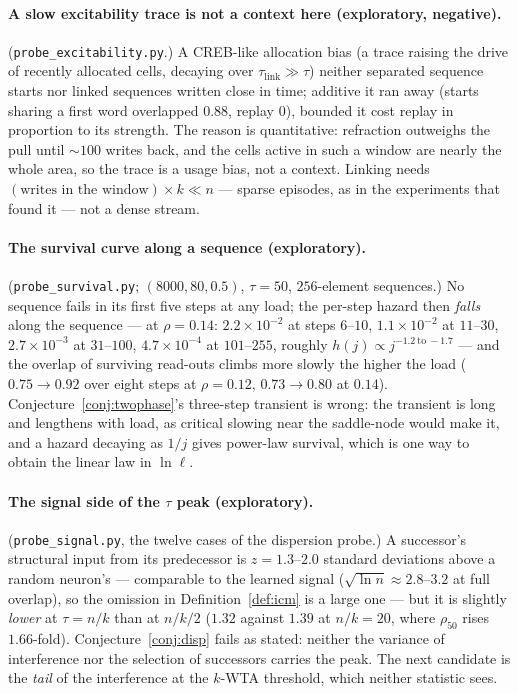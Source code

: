 \documentclass[11pt]{article}
\theoremstyle{definition}
\theoremstyle{plain}
\begin{document}
\paragraph{A slow excitability trace is not a context here (exploratory,
negative).} (\texttt{probe\_excitability.py}.) A CREB-like allocation bias (a
trace raising the drive of recently allocated cells, decaying over
$\tau_{\mathrm{link}} \gg \tau$) neither separated sequence starts nor linked
sequences written close in time; additive it ran away (starts sharing a first
word overlapped $0.88$, replay $0$), bounded it cost replay in proportion to its
strength. The reason is quantitative: refraction outweighs the pull until
$\sim 100$ writes back, and the cells active in such a window are nearly the
whole area, so the trace is a usage bias, not a context. Linking needs
$(\text{writes in the window}) \times k \ll n$ --- sparse episodes, as in the
experiments that found it --- not a dense stream.

\paragraph{The survival curve along a sequence (exploratory).}
(\texttt{probe\_survival.py}; $(8000,80,0.5)$, $\tau = 50$, $256$-element
sequences.) No sequence fails in its first five steps at any load; the
per-step hazard then \emph{falls} along the sequence --- at $\rho = 0.14$:
$2.2\times10^{-2}$ at steps $6$--$10$, $1.1\times10^{-2}$ at $11$--$30$,
$2.7\times10^{-3}$ at $31$--$100$, $4.7\times10^{-4}$ at $101$--$255$, roughly
$h(j) \propto j^{-1.2\ \text{to}\ -1.7}$ --- and the overlap of surviving read-outs
climbs more slowly the higher the load ($0.75 \to 0.92$ over eight steps at
$\rho = 0.12$, $0.73 \to 0.80$ at $0.14$). Conjecture~\ref{conj:twophase}'s
three-step transient is wrong: the transient is long and lengthens with load,
as critical slowing near the saddle-node would make it, and a hazard decaying
as $1/j$ gives power-law survival, which is one way to obtain the linear law in
$\ln\ell$.

\paragraph{The signal side of the $\tau$ peak (exploratory).}
(\texttt{probe\_signal.py}, the twelve cases of the dispersion probe.) A
successor's structural input from its predecessor is $z = 1.3$--$2.0$ standard
deviations above a random neuron's --- comparable to the learned signal
($\sqrt{\ln n} \approx 2.8$--$3.2$ at full overlap), so the omission in
Definition~\ref{def:icm} is a large one --- but it is slightly \emph{lower} at
$\tau = n/k$ than at $n/k/2$ ($1.32$ against $1.39$ at $n/k = 20$, where $\rho_{50}$
rises $1.66$-fold). Conjecture~\ref{conj:disp} fails as stated: neither the
variance of interference nor the selection of successors carries the peak. The
next candidate is the \emph{tail} of the interference at the $k$-WTA threshold,
which neither statistic sees.
\end{document}
